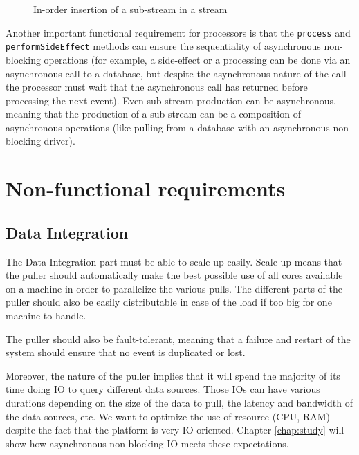 \begin{figure}[h]
  \begin{center} 
    \caption{In-order insertion of a sub-stream in a stream}
    \label{fig:substream}
  \end{center}
\end{figure}

Another important functional requirement for processors is that the \verb|process| and \verb|performSideEffect| methods can ensure the
sequentiality of asynchronous non-blocking operations (for example, a side-effect or a processing can be done via an asynchronous call to a 
database, but despite the asynchronous nature of the call the processor must wait that the asynchronous call has returned
before processing the next event). Even sub-stream production can be asynchronous, meaning that the production of a sub-stream
can be a composition of asynchronous operations (like pulling from a database with an asynchronous non-blocking driver).

\section{Non-functional requirements}

\subsection{Data Integration}

The Data Integration part must be able to scale up easily. Scale up means that the puller should automatically make the best possible
use of all cores available on a machine in order to parallelize the various pulls. The different parts of the puller 
should also be easily distributable in case of the load if too big for one machine to handle. 

The puller should also be fault-tolerant, meaning that a failure and restart of the system should ensure that no event
is duplicated or lost.

Moreover, the nature of the puller implies that it will spend the majority of its time doing IO to query different data sources.
Those IOs can have various durations depending on the size of the data to pull, the latency and bandwidth of the data sources, etc.
We want to optimize the use of resource (CPU, RAM) despite the fact that the platform is very IO-oriented. Chapter \ref{chap:study} will show how asynchronous non-blocking IO meets these expectations.

